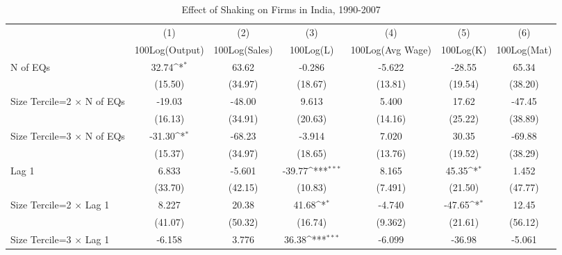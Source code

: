 \begin{table}[htbp]\centering
\def\sym#1{\ifmmode^{#1}\else\(^{#1}\)\fi}
\caption{Effect of Shaking on Firms in India, 1990-2007}
\begin{tabular}{l*{6}{c}}
\toprule
                &\multicolumn{1}{c}{(1)}&\multicolumn{1}{c}{(2)}&\multicolumn{1}{c}{(3)}&\multicolumn{1}{c}{(4)}&\multicolumn{1}{c}{(5)}&\multicolumn{1}{c}{(6)}\\
                &\multicolumn{1}{c}{100Log(Output)}&\multicolumn{1}{c}{100Log(Sales)}&\multicolumn{1}{c}{100Log(L)}&\multicolumn{1}{c}{100Log(Avg Wage)}&\multicolumn{1}{c}{100Log(K)}&\multicolumn{1}{c}{100Log(Mat)}\\
\midrule
N of EQs        &    32.74\sym{*}  &    63.62         &   -0.286         &   -5.622         &   -28.55         &    65.34         \\
                &  (15.50)         &  (34.97)         &  (18.67)         &  (13.81)         &  (19.54)         &  (38.20)         \\
\addlinespace
Size Tercile=2 $\times$ N of EQs&   -19.03         &   -48.00         &    9.613         &    5.400         &    17.62         &   -47.45         \\
                &  (16.13)         &  (34.91)         &  (20.63)         &  (14.16)         &  (25.22)         &  (38.89)         \\
\addlinespace
Size Tercile=3 $\times$ N of EQs&   -31.30\sym{*}  &   -68.23         &   -3.914         &    7.020         &    30.35         &   -69.88         \\
                &  (15.37)         &  (34.97)         &  (18.65)         &  (13.76)         &  (19.52)         &  (38.29)         \\
\addlinespace
Lag 1           &    6.833         &   -5.601         &   -39.77\sym{***}&    8.165         &    45.35\sym{*}  &    1.452         \\
                &  (33.70)         &  (42.15)         &  (10.83)         &  (7.491)         &  (21.50)         &  (47.77)         \\
\addlinespace
Size Tercile=2 $\times$ Lag 1&    8.227         &    20.38         &    41.68\sym{*}  &   -4.740         &   -47.65\sym{*}  &    12.45         \\
                &  (41.07)         &  (50.32)         &  (16.74)         &  (9.362)         &  (21.61)         &  (56.12)         \\
\addlinespace
Size Tercile=3 $\times$ Lag 1&   -6.158         &    3.776         &    36.38\sym{***}&   -6.099         &   -36.98         &   -5.061         \\

\end{tabular}
\end{table}
